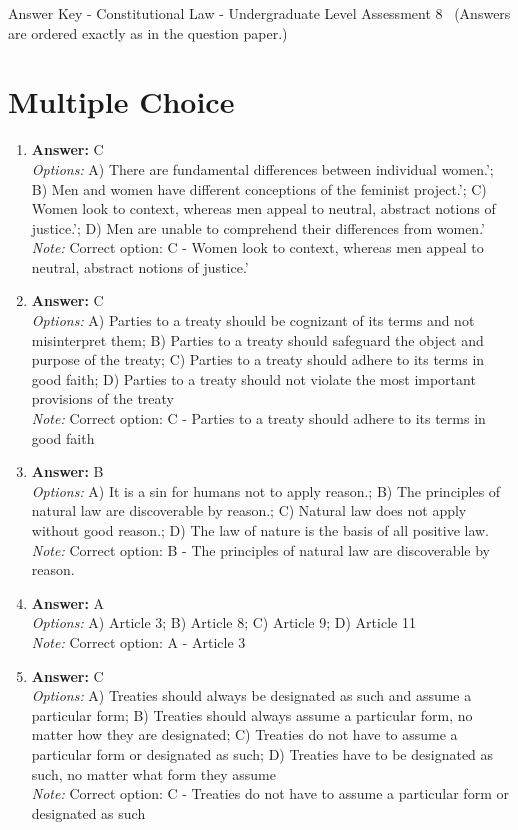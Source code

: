 \documentclass[12pt]{article}
\begin{document}
\begin{center}
Answer Key - Constitutional Law - Undergraduate Level Assessment 8 \
\small (Answers are ordered exactly as in the question paper.)
\end{center}

\section*{Multiple Choice}
\begin{enumerate}[label=\arabic*.]
\item \textbf{Answer:} C
\\ \textit{Options:} A) There are fundamental differences between individual women.'; B) Men and women have different conceptions of the feminist project.'; C) Women look to context, whereas men appeal to neutral, abstract notions of justice.'; D) Men are unable to comprehend their differences from women.'
\\ \textit{Note:} Correct option: C - Women look to context, whereas men appeal to neutral, abstract notions of justice.'
\item \textbf{Answer:} C
\\ \textit{Options:} A) Parties to a treaty should be cognizant of its terms and not misinterpret them; B) Parties to a treaty should safeguard the object and purpose of the treaty; C) Parties to a treaty should adhere to its terms in good faith; D) Parties to a treaty should not violate the most important provisions of the treaty
\\ \textit{Note:} Correct option: C - Parties to a treaty should adhere to its terms in good faith
\item \textbf{Answer:} B
\\ \textit{Options:} A) It is a sin for humans not to apply reason.; B) The principles of natural law are discoverable by reason.; C) Natural law does not apply without good reason.; D) The law of nature is the basis of all positive law.
\\ \textit{Note:} Correct option: B - The principles of natural law are discoverable by reason.
\item \textbf{Answer:} A
\\ \textit{Options:} A) Article 3; B) Article 8; C) Article 9; D) Article 11
\\ \textit{Note:} Correct option: A - Article 3
\item \textbf{Answer:} C
\\ \textit{Options:} A) Treaties should always be designated as such and assume a particular form; B) Treaties should always assume a particular form, no matter how they are designated; C) Treaties do not have to assume a particular form or designated as such; D) Treaties have to be designated as such, no matter what form they assume
\\ \textit{Note:} Correct option: C - Treaties do not have to assume a particular form or designated as such
\end{enumerate}
\end{document}
